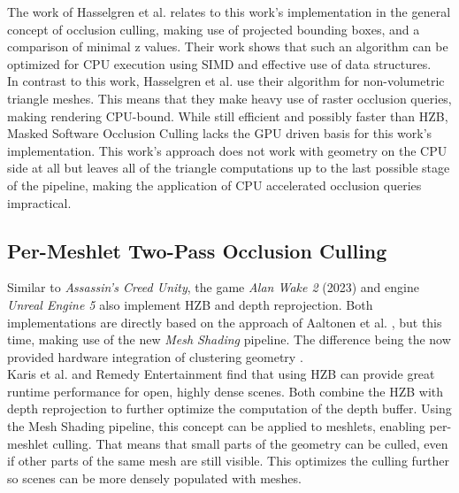 \noindent
The work of Hasselgren et al. relates to this work's implementation in the general concept of occlusion culling, making 
use of projected bounding boxes, and a comparison of minimal z values. Their work shows that such an algorithm can be 
optimized for \ac{CPU} execution using \ac{SIMD} and effective use of data structures. \\

\noindent 
In contrast to this work, Hasselgren et al. use their algorithm for non-volumetric triangle meshes. This means that 
they make heavy use of raster occlusion queries, making rendering CPU-bound. While still efficient and possibly faster 
than \ac{HZB}, Masked Software Occlusion Culling lacks the \ac{GPU} driven basis for this work's implementation. This 
work's approach does not work with geometry on the \ac{CPU} side at all but leaves all of the triangle computations up 
to the last possible stage of the pipeline, making the application of \ac{CPU} accelerated occlusion queries impractical.


\subsection*{Per-Meshlet Two-Pass Occlusion Culling}

Similar to \emph{Assassin's Creed Unity}, the game \emph{Alan Wake 2} (2023) and engine \emph{Unreal Engine 5} also 
implement \ac{HZB} and depth reprojection. Both implementations are directly based on the approach of Aaltonen et 
al. \cite{Aaltonen2015}, but this time, making use of the new \emph{Mesh Shading} pipeline. The difference being the 
now provided hardware integration of clustering geometry \cite{Remedy2023,Karis2021}.  \\

\noindent
Karis et al. and Remedy Entertainment find that using \ac{HZB} can provide great runtime performance for open, 
highly dense scenes. Both combine the \ac{HZB} with depth reprojection to further optimize the computation of the 
depth buffer. Using the Mesh Shading pipeline, this concept can be applied to meshlets, enabling per-meshlet culling. 
That means that small parts of the geometry can be culled, even if other parts of the same mesh are still visible. 
This optimizes the culling further so scenes can be more densely populated with meshes.\\

